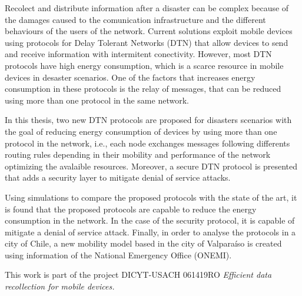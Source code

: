 Recolect and distribute information after a disaster can be complex because of
the damages caused to the comunication infrastructure and the different
behaviours of the users of the network. Current solutions exploit mobile devices
using protocols for Delay Tolerant Networks (DTN) that allow devices to send and
receive information with intermitent conectivity. However, most DTN protocols
have high energy consumption, which is a scarce resource in mobile devices in
desaster scenarios. One of the factors that increases energy consumption in
these protocols is the relay of messages, that can be reduced using more than
one protocol in the same network.



In this thesis, two new DTN protocols are proposed for disasters scenarios with
the goal of reducing energy consumption of devices by using more than one
protocol in the network, i.e., each node exchanges messages following differents
routing rules depending in their mobility and performance of the network
optimizing the avalaible resources. Moreover, a secure DTN protocol is presented
that adds a security layer to mitigate denial of service attacks. 


Using simulations to compare the proposed protocols with the state of the art,
it is found that the proposed protocols are capable to reduce the energy
consumption in the network. In the case of the security protocol, it is capable
of mitigate a denial of service attack.  Finally, in order to analyse the
protocols in a city of Chile, a new mobility model based in the city of
Valparaíso is created using information of the National Emergency Office
(ONEMI).


This work is part of the project DICYT-USACH 061419RO \textit{Efficient data
recollection for mobile devices.} 
